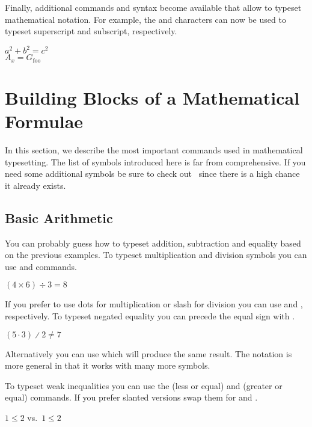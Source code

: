 Finally, additional commands and syntax become available that allow to typeset
mathematical notation. For example, the \ai{\^{}} and \ai{\_} characters can
now be used to typeset superscript and subscript, respectively.%
\begin{example}
\( a^2 + b^2 = c^2 \) \\
\( A_x = G_{\text{foo}} \)
\end{example}

\section{Building Blocks of a Mathematical Formulae}

In this section, we describe the most important commands used in mathematical
typesetting. The list of symbols introduced here is far from comprehensive. If
you need some additional symbols be sure to check out~\cite{detexify,
  unicode-math-symbols, latexcomp} since there is a high chance it already
exists.

\subsection{Basic Arithmetic}

You can probably guess how to typeset addition, subtraction and equality based
on the previous examples. To typeset multiplication and division symbols you can
use  and  commands.
\begin{example}
\( (4 \times 6) \div 3 = 8 \)
\end{example}
If you prefer to use dots for multiplication or slash for division you can use
 and , respectively. To typeset negated equality you can
precede the equal sign with .
\begin{example}
\( (5 \cdot 3) \divslash 2
  \not= 7 \)
\end{example}
Alternatively you can use  which will produce the same result. The
 notation is more general in that it works with many more symbols.

To typeset weak inequalities you can use the  (less or equal) and
 (greater or equal) commands. If you prefer slanted versions swap them
for  and .
\begin{example}
\( 1 \leq 2 \) vs.\ 
\(1 \leqslant 2\)
\end{example}

